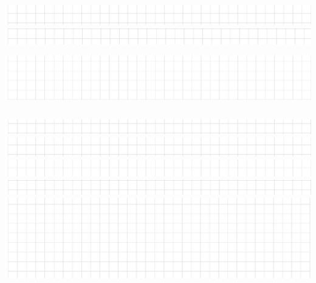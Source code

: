 \documentclass[10pt]{article}
\begin{document}
\includegraphics[max width=\textwidth, center]{2024_11_21_eef8bdc8380ba249dbe1g-11(2)}\\
\includegraphics[max width=\textwidth, center]{2024_11_21_eef8bdc8380ba249dbe1g-11}

\includegraphics[max width=\textwidth]{2024_11_21_eef8bdc8380ba249dbe1g-11(6)} \begin{tabular}{l|l|l|l|l|l|l|l|l|l|l|l|l}
 \\
\hline
\end{tabular}

\includegraphics[max width=\textwidth, center]{2024_11_21_eef8bdc8380ba249dbe1g-11(5)}\\
\includegraphics[max width=\textwidth, center]{2024_11_21_eef8bdc8380ba249dbe1g-11(3)}\\
\includegraphics[max width=\textwidth, center]{2024_11_21_eef8bdc8380ba249dbe1g-11(4)}\\
\includegraphics[max width=\textwidth, center]{2024_11_21_eef8bdc8380ba249dbe1g-11(1)}\\
\includegraphics[max width=\textwidth, center]{2024_11_21_eef8bdc8380ba249dbe1g-11(7)}
\end{document}
